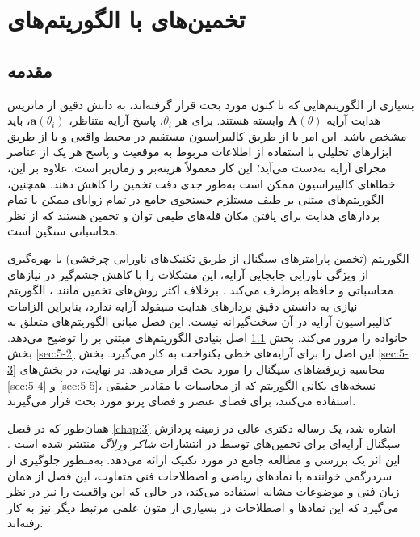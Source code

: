 

\chapter{تخمین‌های  با الگوریتم‌های }
\label{chap:5}

\section{مقدمه}
\label{sec:5-1}
بسیاری از الگوریتم‌هایی که تا کنون مورد بحث قرار گرفته‌اند، به دانش دقیق از ماتریس هدایت آرایه $\bm{A}(\theta)$ وابسته هستند. برای هر $\theta_i$، پاسخ آرایه متناظر، $\bm{a}(\theta_i)$، باید مشخص باشد. این امر یا از طریق کالیبراسیون مستقیم در محیط واقعی و یا از طریق ابزارهای تحلیلی با استفاده از اطلاعات مربوط به موقعیت و پاسخ هر یک از عناصر مجزای آرایه به‌دست می‌آید؛ این کار معمولاً هزینه‌بر و زمان‌بر است. علاوه بر این، خطاهای کالیبراسیون ممکن است به‌طور جدی دقت تخمین را کاهش دهند. همچنین، الگوریتم‌های  مبتنی بر طیف مستلزم جستجوی جامع در تمام زوایای ممکن یا تمام بردارهای هدایت برای یافتن مکان قله‌های طیفی توان و تخمین  هستند که از نظر محاسباتی سنگین است.

الگوریتم  (تخمین پارامترهای سیگنال از طریق تکنیک‌های ناورایی چرخشی) با بهره‌گیری از ویژگی ناورایی جابجایی آرایه، این مشکلات را با کاهش چشم‌گیر در نیازهای محاسباتی و حافظه برطرف می‌کند \cite{5-1}. برخلاف اکثر روش‌های تخمین  مانند ، الگوریتم  نیازی به دانستن دقیق بردارهای هدایت منیفولد آرایه ندارد، بنابراین الزامات کالیبراسیون آرایه در آن سخت‌گیرانه نیست. این فصل مبانی الگوریتم‌های متعلق به خانواده  را مرور می‌کند. بخش \ref{sec:5-1} اصل بنیادی الگوریتم‌های مبتنی بر  را توضیح می‌دهد. بخش \ref{sec:5-2} این اصل را برای آرایه‌های خطی یکنواخت به کار می‌گیرد. بخش \ref{sec:5-3} محاسبه زیرفضاهای سیگنال را مورد بحث قرار می‌دهد. در نهایت، در بخش‌های \ref{sec:5-4} و \ref{sec:5-5}، نسخه‌های یکانی الگوریتم  که از محاسبات با مقادیر حقیقی استفاده می‌کنند، برای فضای عنصر و فضای پرتو مورد بحث قرار می‌گیرند.

همان‌طور که در فصل \ref{chap:3} اشاره شد، یک رساله دکتری عالی در زمینه پردازش سیگنال آرایه‌ای برای تخمین‌های  توسط  در انتشارات \textit{شاکر ورلاگ} منتشر شده است \cite{5-1}. این اثر یک بررسی و مطالعه جامع در مورد تکنیک  ارائه می‌دهد. به‌منظور جلوگیری از سردرگمی خواننده با نمادهای ریاضی و اصطلاحات فنی متفاوت، این فصل از همان زبان فنی و موضوعات مشابه استفاده می‌کند، در حالی که این واقعیت را نیز در نظر می‌گیرد که این نمادها و اصطلاحات در بسیاری از متون علمی مرتبط دیگر نیز به کار رفته‌اند.

